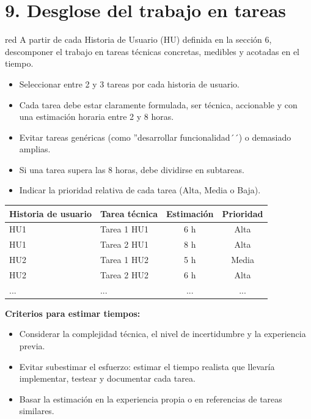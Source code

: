 \section{9. Desglose del trabajo en tareas}
\label{sec:wbs}


\begin{consigna}{red}
A partir de cada Historia de Usuario (HU) definida en la sección 6, descomponer el trabajo en tareas técnicas concretas, medibles y acotadas en el tiempo.

\begin{itemize}
\item Seleccionar entre 2 y 3 tareas por cada historia de usuario.
\item Cada tarea debe estar claramente formulada, ser técnica, accionable y con una estimación horaria entre 2 y 8 horas.
\item Evitar tareas genéricas (como ''desarrollar funcionalidad´´) o demasiado amplias.
\item Si una tarea supera las 8 horas, debe dividirse en subtareas.
\item Indicar la prioridad relativa de cada tarea (Alta, Media o Baja).
\end{itemize}

\begin{table}[htpb]
\centering
\begin{tabularx}{\linewidth}{@{}|X|X|c|c|@{}}
\hline
\rowcolor[HTML]{C0C0C0}
Historia de usuario & Tarea técnica & Estimación & Prioridad \\ \hline
HU1 & Tarea 1 HU1 & 6 h & Alta \\ \hline
HU1 & Tarea 2 HU1 & 8 h & Alta \\ \hline
HU2 & Tarea 1 HU2 & 5 h & Media \\ \hline
HU2 & Tarea 2 HU2 & 6 h & Alta \\ \hline
... & ... & ... & ... \\ \hline
\end{tabularx}
\end{table}

\textbf{Criterios para estimar tiempos:}
\begin{itemize}
  \item Considerar la complejidad técnica, el nivel de incertidumbre y la experiencia previa.
  \item Evitar subestimar el esfuerzo: estimar el tiempo realista que llevaría implementar, testear y documentar cada tarea.
  \item Basar la estimación en la experiencia propia o en referencias de tareas similares.
\end{itemize}


\end{consigna}
